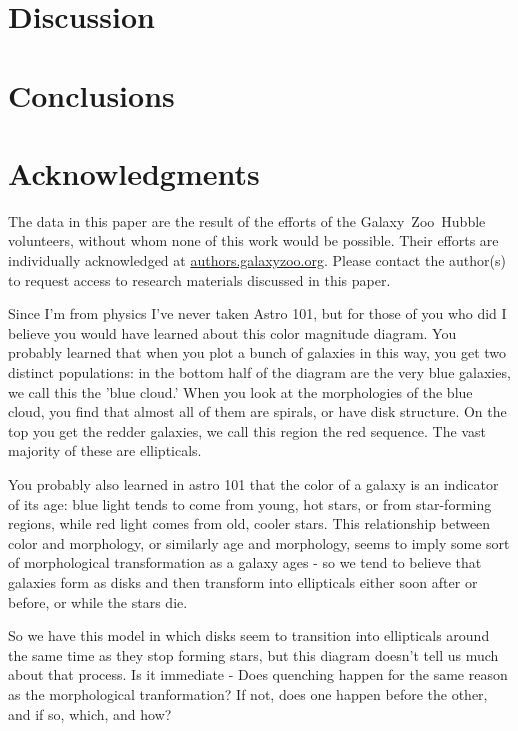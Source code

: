 \documentclass[useAMS,usenatbib]{mn2e}
\begin{document}
\section{Discussion}\label{sec:Discussion}


\section{Conclusions}
\label{sec:conclusions}




\section*{Acknowledgments}
The data in this paper are the result of the efforts of the Galaxy~Zoo~Hubble volunteers, without whom none of this work would be possible. Their efforts are individually acknowledged at \url{authors.galaxyzoo.org}. Please contact the author(s) to request access to research materials discussed in this paper. 


Since I'm from physics I've never taken Astro 101, but for those of you who did I believe you would have learned about this color magnitude diagram. You probably learned that when you plot a bunch of galaxies in this way, you get two distinct populations: in the bottom half of the diagram are the very blue galaxies, we call this the 'blue cloud.' When you look at the morphologies of the blue cloud, you find that almost all of them are spirals, or have disk structure. On the top you get the redder galaxies, we call this region the red sequence. The vast majority of these are ellipticals. 

You probably also learned in astro 101 that the color of a galaxy is an indicator of its age: blue light tends to come from young, hot stars, or from star-forming regions, while red light comes from old, cooler stars. This relationship between color and morphology, or similarly age and morphology, seems to imply some sort of morphological transformation as a galaxy ages - so we tend to believe that galaxies form as disks and then transform into ellipticals either soon after or before, or while the stars die.

So we have this model in which disks seem to transition into ellipticals around the same time as they stop forming stars, but this diagram doesn't tell us much about that process. Is it immediate - Does quenching happen for the same reason as the morphological tranformation? If not, does one happen before the other, and if so, which, and how? 
\end{document}
